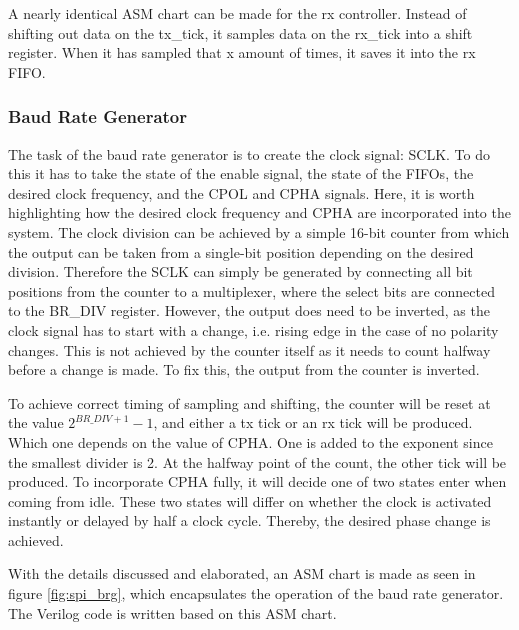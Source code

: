 \documentclass[./dissertation.tex]{subfiles}
\begin{document}
A nearly identical ASM chart can be made for the rx controller. Instead of shifting out data on the tx\_tick, it samples data on the rx\_tick into a shift register. When it has sampled that x amount of times, it saves it into the rx FIFO. 

\subsubsection{Baud Rate Generator}
The task of the baud rate generator is to create the clock signal: SCLK. To do this it has to take the state of the enable signal, the state of the FIFOs, the desired clock frequency, and the CPOL and CPHA signals. Here, it is worth highlighting how the desired clock frequency and CPHA are incorporated into the system. The clock division can be achieved by a simple 16-bit counter from which the output can be taken from a single-bit position depending on the desired division. Therefore the SCLK can simply be generated by connecting all bit positions from the counter to a multiplexer, where the select bits are connected to the BR\_DIV register. However, the output does need to be inverted, as the clock signal has to start with a change, i.e. rising edge in the case of no polarity changes. This is not achieved by the counter itself as it needs to count halfway before a change is made. To fix this, the output from the counter is inverted. 

To achieve correct timing of sampling and shifting, the counter will be reset at the value $2^{BR\_DIV+1}-1$, and either a tx tick or an rx tick will be produced. Which one depends on the value of CPHA. One is added to the exponent since the smallest divider is 2. At the halfway point of the count, the other tick will be produced. To incorporate CPHA fully, it will decide one of two states enter when coming from idle. These two states will differ on whether the clock is activated instantly or delayed by half a clock cycle. Thereby, the desired phase change is achieved.  

With the details discussed and elaborated, an ASM chart is made as seen in figure \ref{fig:spi_brg}, which encapsulates the operation of the baud rate generator. The Verilog code is written based on this ASM chart.    
\end{document}
